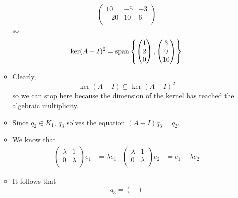 \documentclass[../notes.tex]{subfiles}
\begin{document}
\begin{itemize}
\begin{itemize}
\begin{equation*}
\begin{pmatrix}
                10 & -5 & -3\\
                -20 & 10 & 6\\
            \end{pmatrix}
        \end{equation*}
        so
        \begin{equation*}
            \ker(A-I)^2 = \operatorname{span}\left\{
                \begin{pmatrix}
                    1\\
                    2\\
                    0\\
                \end{pmatrix},
                \begin{pmatrix}
                    3\\
                    0\\
                    10\\
                \end{pmatrix}
            \right\}
        \end{equation*}
        \item Clearly,
        \begin{equation*}
            \ker(A-I) \subsetneq \ker(A-I)^2
        \end{equation*}
        so we can stop here because the dimension of the kernel has reached the algebraic multiplicity.
        \item Since $q_2\in K_1$, $q_3$ solves the equation $(A-I)q_3=q_2$.
        \item We know that
        \begin{align*}
            \begin{pmatrix}
                \lambda & 1\\
                0 & \lambda\\
            \end{pmatrix}
            e_1 &= \lambda e_1&
            \begin{pmatrix}
                \lambda & 1\\
                0 & \lambda\\
            \end{pmatrix}
            e_2 &= e_1+\lambda e_2
        \end{align*}
        \item It follows that
        \begin{equation*}
            q_3 =
            \begin{pmatrix}

\end{pmatrix}
\end{equation*}
\end{itemize}
\end{itemize}
\end{document}
